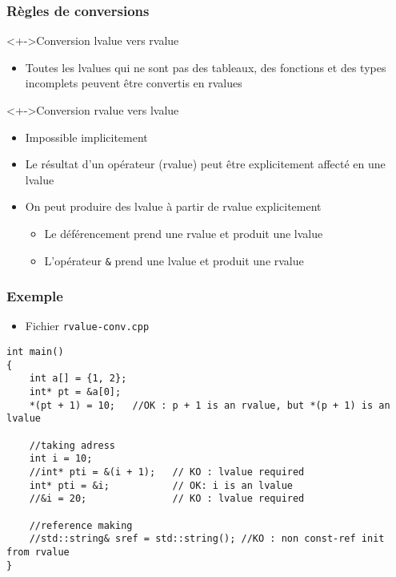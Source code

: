 \begin{frame}
\frametitle{Règles de conversions}
\begin{exampleblock}<+->{Conversion lvalue vers rvalue}
	\begin{itemize}[<+->]
	\item Toutes les lvalues qui ne sont pas des tableaux, des fonctions et des types incomplets peuvent être convertis en rvalues
	\end{itemize}
\end{exampleblock}
\begin{alertblock}<+->{Conversion rvalue vers lvalue}
	\begin{itemize}[<+->]
	\item Impossible implicitement
	\item Le résultat d'un opérateur (rvalue) peut être explicitement affecté en une lvalue
	\end{itemize}
\end{alertblock}
\begin{itemize}[<+->]
\item On peut produire des lvalue à partir de rvalue explicitement
	\begin{itemize}
	\item Le déférencement prend une rvalue et produit une lvalue
	\item L'opérateur \texttt{\&} prend une lvalue et produit une rvalue
	\end{itemize}
\end{itemize}
\end{frame}

\begin{frame}[containsverbatim]
\frametitle{Exemple}
\begin{itemize}
\item Fichier \texttt{rvalue-conv.cpp}
\end{itemize}
\begin{lstlisting}
int main()
{
	int a[] = {1, 2};
	int* pt = &a[0];
	*(pt + 1) = 10;   //OK : p + 1 is an rvalue, but *(p + 1) is an lvalue

	//taking adress
	int i = 10;
	//int* pti = &(i + 1);   // KO : lvalue required
	int* pti = &i;           // OK: i is an lvalue
	//&i = 20;               // KO : lvalue required

	//reference making
	//std::string& sref = std::string(); //KO : non const-ref init from rvalue
}
\end{lstlisting}
\end{frame}

